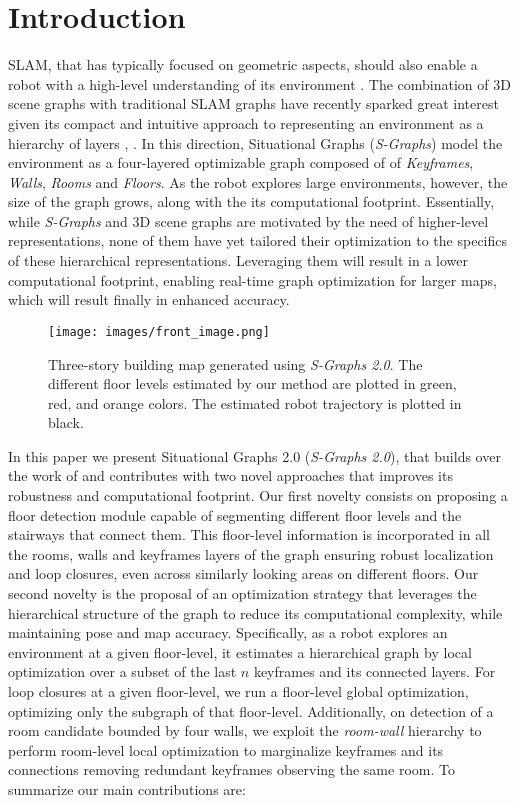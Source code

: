 \section{Introduction}

SLAM, that has typically focused on geometric aspects, should also enable a robot with a high-level understanding of its environment \cite{cadena2016past}. The combination of 3D scene graphs with traditional SLAM graphs have recently sparked great interest given its compact and intuitive approach to representing an environment as a hierarchy of layers \cite{hydra}, \cite{curb_sg}. In this direction, Situational Graphs (\textit{S-Graphs}) \cite{s_graphs+} model the environment as a four-layered optimizable graph composed of of \textit{Keyframes}, \textit{Walls}, \textit{Rooms} and \textit{Floors}. As the robot explores large environments, however, the size of the graph grows, along with the its computational footprint. Essentially, while \textit{S-Graphs} and 3D scene graphs are motivated by the need of higher-level representations, none of them have yet tailored their optimization to the specifics of these hierarchical representations. Leveraging them will result in a lower computational footprint, enabling real-time graph optimization for larger maps, which will result finally in enhanced accuracy.

\begin{figure}[t]
  \centering
  \texttt{[image: images/front\_image.png]}
  \caption{Three-story building map generated using \textit{S-Graphs 2.0}. The different floor levels estimated by our method are plotted in green, red, and orange colors. The estimated robot trajectory is plotted in black.}
  \label{fig:front_image}
\end{figure}

In this paper we present Situational Graphs 2.0 (\textit{S-Graphs 2.0}), that builds over the work of \cite{s_graphs+} and contributes with two novel approaches that improves its robustness and computational footprint. Our first novelty consists on proposing a floor detection module capable of segmenting different floor levels and the stairways that connect them. This floor-level information is incorporated in all the rooms, walls and keyframes layers of the graph ensuring robust localization and loop closures, even across similarly looking areas on different floors. Our second novelty is the proposal of an optimization strategy that leverages the hierarchical structure of the graph to reduce its computational complexity, while maintaining pose and map accuracy. Specifically, as a robot explores an environment at a given floor-level, it estimates a hierarchical graph by local optimization over a subset of the last $n$ keyframes and its connected layers. For loop closures at a given floor-level, we run a floor-level global optimization, optimizing only the subgraph of that floor-level. Additionally, on detection of a room candidate bounded by four walls, we exploit the \textit{room-wall} hierarchy to perform room-level local optimization to marginalize keyframes and its connections removing redundant keyframes observing the same room. To summarize our main contributions are:


